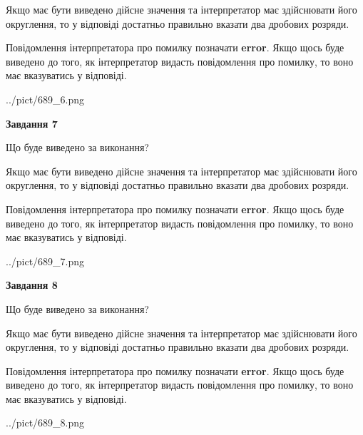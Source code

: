 \documentclass[12pt, ukrainian]{article}
\begin{document}
{\begin {Large}
Якщо має бути виведено дійсне значення та інтерпретатор має здійснювати його округлення, 
то у відповіді достатньо правильно вказати два дробових розряди.

Повідомлення інтерпретатора про помилку позначати \textbf{error}.
Якщо щось буде виведено до того, як інтерпретатор видасть повідомлення про помилку, 
то воно має вказуватись у відповіді. \par

\begin{center}
	{../pict/689_6.png}
\end{center}
\newpage

{\begin {center}\textbf{Завдання 7}\end {center}}\par
Що буде виведено за виконання? \par

Якщо має бути виведено дійсне значення та інтерпретатор має здійснювати його округлення, 
то у відповіді достатньо правильно вказати два дробових розряди.

Повідомлення інтерпретатора про помилку позначати \textbf{error}.
Якщо щось буде виведено до того, як інтерпретатор видасть повідомлення про помилку, 
то воно має вказуватись у відповіді. \par

\begin{center}
	{../pict/689_7.png}
\end{center}
\newpage

{\begin {center}\textbf{Завдання 8}\end {center}}\par
Що буде виведено за виконання? \par

Якщо має бути виведено дійсне значення та інтерпретатор має здійснювати його округлення, 
то у відповіді достатньо правильно вказати два дробових розряди.

Повідомлення інтерпретатора про помилку позначати \textbf{error}.
Якщо щось буде виведено до того, як інтерпретатор видасть повідомлення про помилку, 
то воно має вказуватись у відповіді. \par

\begin{center}
	{../pict/689_8.png}
\end{center}
\newpage


\end{Large}}
\end{document}
